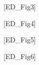 [ED\_Fig3] \label{fig:belief}

[ED\_Fig4] \label{fig:global_share_mean}

[ED\_Fig5] \label{fig:foreign_aid_raise_support}

[ED\_Fig6] \label{fig:foreign_aid_condition}

